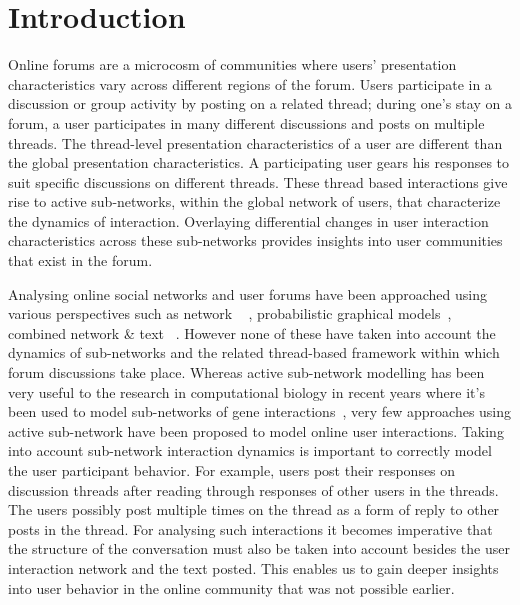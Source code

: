 \documentclass{sig-alternate}
\begin{document}
\section{Introduction}
Online forums are a microcosm of communities where users' presentation
characteristics vary across different regions of the forum. Users participate in
a discussion or group activity by posting on a related thread; during one's
stay on a forum, a user participates in many different discussions and posts on
multiple threads. The thread-level presentation characteristics of a user are different
than the global presentation characteristics. A participating user gears his
responses to suit specific discussions on different threads. These thread based
interactions give rise to active sub-networks, within the global network of users,
that characterize the dynamics of interaction. Overlaying differential changes
in user interaction characteristics across these sub-networks provides
insights into user communities that exist in the forum. 

Analysing online social networks and user forums have been approached using
various perspectives such as network ~\cite{Shi:2000:NCI:351581.351611,
Shi00learningsegmentation} , probabilistic 
graphical models~\cite{ Airoldi:2008:MMS:1390681.1442798}, 
combined network \& text 
~\cite{Ho:2012:DHT:2187836.2187936,Nallapati:2008:JLT:1401890.1401957}. 
However none of these have taken
into account the dynamics of sub-networks and the related thread-based framework
within which forum discussions take place. Whereas
active sub-network modelling has been very useful to the research in
computational biology in recent years where it's been used to model sub-networks
of gene interactions~\cite{journals/ploscb/DeshpandeSVHM10,Lichtenstein:Charleston},
very few approaches using active sub-network have been proposed to model online
 user interactions. Taking into account sub-network interaction
dynamics is important to correctly model the user participant behavior. For
example, users post their
responses on discussion threads after reading through responses of
other users in the threads. The users possibly post multiple times on the thread
 as a form of reply to other posts in the thread. For analysing such
 interactions it becomes imperative that the structure of the conversation must also be taken
into account  besides the user interaction network and the
text posted. This enables us to gain deeper insights into user behavior in the
online community that was not possible earlier. 
\end{document}
